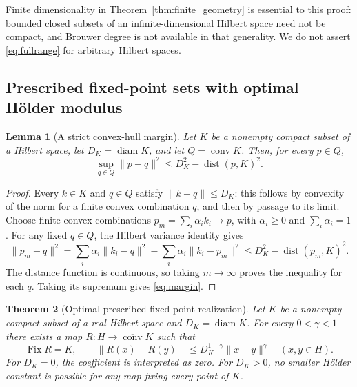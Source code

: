 \documentclass[11pt]{article}
\numberwithin{equation}{section}
\newtheorem{theorem}{Theorem}[section]
\newtheorem{lemma}[theorem]{Lemma}
\theoremstyle{definition}
\theoremstyle{remark}
\newcommand{\dist}{\operatorname{dist}}
\newcommand{\diam}{\operatorname{diam}}
\newcommand{\Fix}{\operatorname{Fix}}
\newcommand{\conv}{\operatorname{conv}}
\newcommand{\norm}[1]{\lVert #1\rVert}
\begin{document}
Finite dimensionality in Theorem~\ref{thm:finite_geometry} is essential
to this proof: bounded closed subsets of an infinite-dimensional Hilbert
space need not be compact, and Brouwer degree is not available in that
generality. We do not assert \eqref{eq:fullrange} for arbitrary Hilbert
spaces.

\subsection{Prescribed fixed-point sets with optimal H\"older modulus}

\begin{lemma}[A strict convex-hull margin]\label{lem:margin}
Let $K$ be a nonempty compact subset of a Hilbert space, let
$D_K=\diam K$, and let $Q=\overline{\conv}K$. Then, for every $p\in Q$,
\begin{equation}\label{eq:margin}
 \sup_{q\in Q}\norm{p-q}^2
 \le D_K^2-\dist(p,K)^2.
\end{equation}
\end{lemma}

\begin{proof}
Every $k\in K$ and $q\in Q$ satisfy $\norm{k-q}\le D_K$: this follows
by convexity of the norm for a finite convex combination $q$, and then
by passage to its limit. Choose finite convex combinations
$p_m=\sum_i\alpha_i k_i\to p$, with $\alpha_i\ge0$ and
$\sum_i\alpha_i=1$. For any fixed $q\in Q$, the Hilbert variance identity
gives
\[
 \norm{p_m-q}^2
 =\sum_i\alpha_i\norm{k_i-q}^2
  -\sum_i\alpha_i\norm{k_i-p_m}^2
 \le D_K^2-\dist(p_m,K)^2.
\]
The distance function is continuous, so taking $m\to\infty$ proves
the inequality for each $q$. Taking its supremum gives
\eqref{eq:margin}.
\end{proof}

\begin{theorem}[Optimal prescribed fixed-point realization]\label{thm:fixedset}
Let $K$ be a nonempty compact subset of a real Hilbert space and
$D_K=\diam K$. For every $0<\gamma<1$ there exists a map
$R:H\to\overline{\conv}K$ such that
\begin{equation}\label{eq:fixedset}
 \Fix R=K,\qquad
 \norm{R(x)-R(y)}\le D_K^{1-\gamma}\norm{x-y}^\gamma
 \quad(x,y\in H).
\end{equation}
For $D_K=0$, the coefficient is interpreted as zero. For $D_K>0$, no
smaller H\"older constant is possible for any map fixing every point of
$K$.
\end{theorem}
\end{document}
